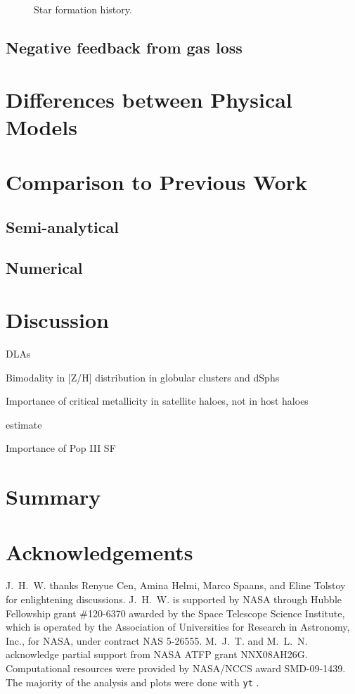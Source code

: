 \documentclass[useAMS,usenatbib]{mn2e}
\begin{document}
\begin{figure*}
  \caption{\label{fig:SFR} Star formation history.}
\end{figure*}

\subsection{Negative feedback from gas loss}

\section{Differences between Physical Models}
\label{sec:models}

\section{Comparison to Previous Work}
\label{sec:compare}

\subsection{Semi-analytical}

\subsection{Numerical}

\section{Discussion}
\label{sec:discuss}

\li DLAs

\li Bimodality in [Z/H] distribution in globular clusters and dSphs

\li Importance of critical metallicity in satellite haloes, not in host
haloes

\li [$\alpha$/Fe] estimate

\li Importance of Pop III SF

\section{Summary}
\label{sec:summary}

\section*{Acknowledgements}

J.~H.~W. thanks Renyue Cen, Amina Helmi, Marco Spaans, and Eline
Tolstoy for enlightening discussions.  J.~H.~W. is supported by NASA
through Hubble Fellowship grant \#120-6370 awarded by the Space
Telescope Science Institute, which is operated by the Association of
Universities for Research in Astronomy, Inc., for NASA, under contract
NAS 5-26555.  M.~J.~T. and M.~L.~N. acknowledge partial support from
NASA ATFP grant NNX08AH26G.  Computational resources were provided by
NASA/NCCS award SMD-09-1439.  The majority of the analysis and plots
were done with \texttt{yt} \citep{yt_full_paper}.


\bsp
\label{lastpage}
\end{document}
